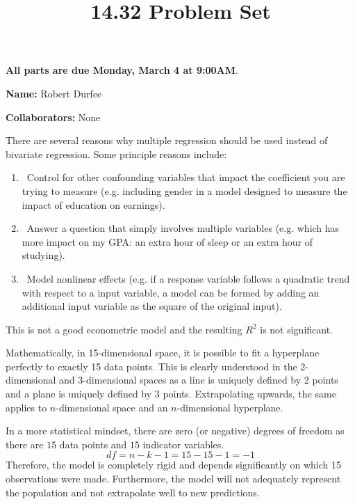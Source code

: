 \documentclass[12pt,twoside]{article}
\title{14.32 Problem Set \theproblemsetnum}
\newcommand{\theproblemsetnum}{2}
\newcommand{\releasedate}{Monday, February 25}
\newcommand{\partaduedate}{Monday, March 4}
\begin{document}
\handout{Problem Set \theproblemsetnum}{\releasedate}
\textbf{All parts are due {\bf \partaduedate} at {\bf 9:00AM}}.

\setlength{\parindent}{0pt}
\medskip\hrulefill\medskip

{\bf Name:} Robert Durfee

\medskip

{\bf Collaborators:} None

\medskip\hrulefill

\begin{problems}

\problem  %
There are several reasons why multiple regression should be used instead of 
bivariate regression. Some principle reasons include:

\begin{enumerate}
    \item\ Control for other confounding variables that impact the coefficient
    you are trying to measure (e.g. including gender in a model designed to 
    measure the impact of education on earnings).
    \item\ Answer a question that simply involves multiple variables (e.g. 
    which has more impact on my GPA: an extra hour of sleep or an extra hour of 
    studying).
    \item\ Model nonlinear effects (e.g. if a response variable follows a
    quadratic trend with respect to a input variable, a model can be formed by
    adding an additional input variable as the square of the original input).
\end{enumerate}

\problem  %

This is not a good econometric model and the resulting $R^2$ is not significant.

Mathematically, in 15-dimensional space, it is possible to fit a hyperplane
perfectly to exactly 15 data points. This is clearly understood in the 2-
dimensional and 3-dimensional spaces as a line is uniquely defined by 2 points 
and a plane is uniquely defined by 3 points. Extrapolating upwards, the same
applies to $n$-dimensional space and an $n$-dimensional hyperplane.

In a more statistical mindset, there are zero (or negative) degrees of freedom
as there are $15$ data points and $15$ indicator variables.
$$ df = n - k - 1 = 15 - 15 - 1 = -1 $$
Therefore, the model is completely rigid and depends significantly on which 15
observations were made. Furthermore, the model will not adequately represent
the population and not extrapolate well to new predictions.


\end{problems}
\end{document}
